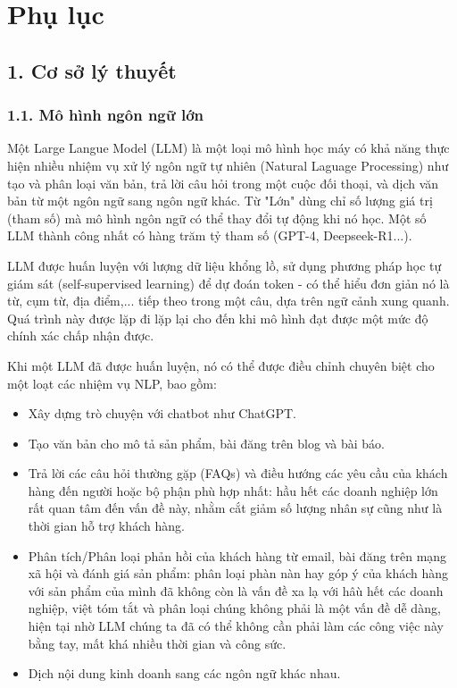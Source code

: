 \newpage
\appendix
{}
\section*{Phụ lục}

\subsection*{1. Cơ sở lý thuyết}
\subsubsection*{1.1. Mô hình ngôn ngữ lớn}

Một Large Langue Model (LLM) là một loại mô hình học máy có khả năng thực hiện nhiều nhiệm vụ xử lý ngôn ngữ tự nhiên (Natural Laguage Processing) như tạo và phân loại văn bản, trả lời câu hỏi trong một cuộc đối thoại, và dịch văn bản từ một ngôn ngữ sang ngôn ngữ khác. Từ "Lớn" dùng  chỉ số lượng giá trị (tham số) mà mô hình ngôn ngữ có thể thay đổi tự động khi nó học. Một số LLM thành công nhất có hàng trăm tỷ tham số (GPT-4, Deepseek-R1...).

LLM được huấn luyện với lượng dữ liệu khổng lồ, sử dụng phương pháp học tự giám sát (self-supervised learning) để dự đoán token - có thể hiểu đơn giản nó là từ, cụm từ, địa điểm,... tiếp theo trong một câu, dựa trên ngữ cảnh xung quanh. Quá trình này được lặp đi lặp lại cho đến khi mô hình đạt được một mức độ chính xác chấp nhận được.

Khi một LLM đã được huấn luyện, nó có thể được điều chỉnh chuyên biệt cho một loạt các nhiệm vụ NLP, bao gồm:
\begin{itemize}
	\item Xây dựng trò chuyện với chatbot như ChatGPT.
	\item Tạo văn bản cho mô tả sản phẩm, bài đăng trên blog và bài báo.
	\item Trả lời các câu hỏi thường gặp (FAQs) và điều hướng các yêu cầu của khách hàng đến người hoặc bộ phận phù hợp nhất: hầu hết các doanh nghiệp lớn rất quan tâm đến vấn đề này, nhằm cắt giảm số lượng nhân sự cũng như là thời gian hỗ trợ khách hàng.
	\item Phân tích/Phân loại phản hồi của khách hàng từ email, bài đăng trên mạng xã hội và đánh giá sản phẩm: phân loại phàn nàn hay góp ý của khách hàng với sản phẩm của mình đã không còn là vấn đề xa lạ với hâù hết các doanh nghiệp, việt tóm tắt và phân loại chúng không phải là một vấn đề dễ dàng, hiện tại nhờ LLM chúng ta đã có thể không cần phải làm các công việc này bằng tay, mất khá nhiều thời gian và công sức.
	\item Dịch nội dung kinh doanh sang các ngôn ngữ khác nhau.
\end{itemize}

